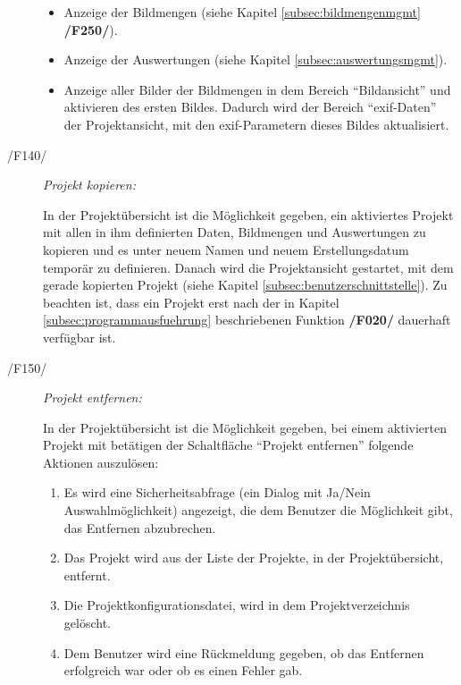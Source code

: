 \begin{description}
\begin{itemize}
				\item Anzeige der Bildmengen (siehe Kapitel \ref{subsec:bildmengenmgmt} \textbf{/F250/}).
				
				\item Anzeige der Auswertungen (siehe Kapitel \ref{subsec:auswertungsmgmt}).
				
				\item Anzeige aller Bilder der Bildmengen in dem Bereich "`Bildansicht"' und aktivieren des ersten Bildes. Dadurch wird der Bereich "`\gls{exif}-Daten"' der Projektansicht, mit den \gls{exif}-Parametern dieses Bildes aktualisiert.
			
			\end{itemize}		
		
		\item[/F140/] \textit{Projekt kopieren:}\par In der Projektübersicht ist die Möglichkeit gegeben, ein aktiviertes Projekt mit allen in ihm definierten Daten, Bildmengen und Auswertungen zu kopieren und es unter neuem Namen und neuem Erstellungsdatum temporär zu definieren. Danach wird die Projektansicht gestartet, mit dem gerade kopierten Projekt (siehe Kapitel \ref{subsec:benutzerschnittstelle}). Zu beachten ist, dass ein Projekt erst nach der in Kapitel \ref{subsec:programmausfuehrung} beschriebenen Funktion \textbf{/F020/} dauerhaft verfügbar ist.
		
		\item[/F150/] \textit{Projekt entfernen:}\par In der Projektübersicht ist die Möglichkeit gegeben, bei einem aktivierten Projekt mit betätigen der Schaltfläche "`Projekt entfernen"' folgende Aktionen auszulösen:
			
			\begin{enumerate}
				
				\item Es wird eine Sicherheitsabfrage (ein Dialog mit Ja/Nein Auswahlmöglichkeit) angezeigt, die dem Benutzer die Möglichkeit gibt, das Entfernen abzubrechen.
				
				\item Das Projekt wird aus der Liste der Projekte, in der Projektübersicht, entfernt.
				
				\item Die Projektkonfigurationsdatei, wird in dem Projektverzeichnis gelöscht.
				
				\item Dem Benutzer wird eine Rückmeldung gegeben, ob das Entfernen erfolgreich war oder ob es einen Fehler gab.
			

\end{enumerate}
\end{description}
